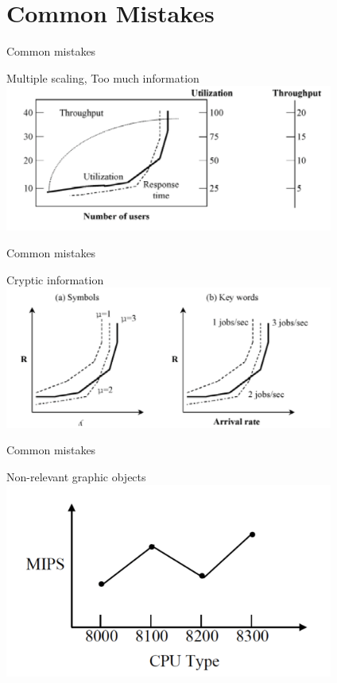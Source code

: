 \documentclass[xcolor=x11names,compress,8pt,fleqn]{beamer}
\renewcommand{\(}{\begin{columns}}
\renewcommand{\)}{\end{columns}}
\newcommand{\<}[1]{\begin{column}{#1}}
\renewcommand{\>}{\end{column}}
\begin{document}
\section{Common Mistakes}
\begin{frame}{Common mistakes}
\begin{block}{Multiple scaling, Too much information}
\includegraphics[width=10.8cm]{Jain-graph3}
\end{block}
\end{frame}
\begin{frame}{Common mistakes}
\begin{block}{Cryptic information}
\includegraphics[width=10.8cm]{Jain-graph4}
\end{block}
\end{frame}
\begin{frame}{Common mistakes}
\begin{block}{Non-relevant graphic objects}
\includegraphics[width=10.8cm]{Jain-graph5}
\end{block}
\end{frame}
\end{document}
